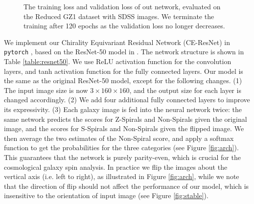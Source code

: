 \documentclass[twocolumn]{aastex631}
\begin{document}
\begin{figure}
    \caption{The training loss and validation loss of out network, evaluated on the Reduced GZ1 dataset with SDSS images.
    We terminate the training after 120 epochs as the validation loss no longer decreases.}
    \label{fig:loss-epoch}
\end{figure}

We implement our Chirality Equivariant Residual Network (CE-ResNet) in \texttt{pytorch} \citep{pytorch}, based on the ResNet-50 model in \citet{he2016deep}.
The network structure is shown in Table \ref{table:resnet50}.
We use ReLU activation function for the convolution layers, and tanh activation function for the fully connected layers.
Our model is the same as the original ResNet-50 model, except for the following changes.
(1) The input image size is now $3 \times 160 \times 160$, and the output size for each layer is changed accordingly.
(2) We add four additional fully connected layers to improve its expressivity.
(3) Each galaxy image is fed into the neural network twice: the same network predicts the scores for Z-Spirals and Non-Spirals given the original image, and the scores for S-Spirals and Non-Spirals given the flipped image.
We then average the two estimates of the Non-Spiral score, and apply a softmax function to get the probabilities for the three categories (see Figure \ref{fig:arch}).
This guarantees that the network is purely parity-even, which is crucial for the cosmological galaxy spin analysis.
In practice we flip the images about the vertical axis (i.e. left to right), as illustrated in Figure \ref{fig:arch}, while we note that the direction of flip should not affect the performance of our model, which is insensitive to the orientation of input image (see Figure \ref{fig:stable}).
\end{document}
